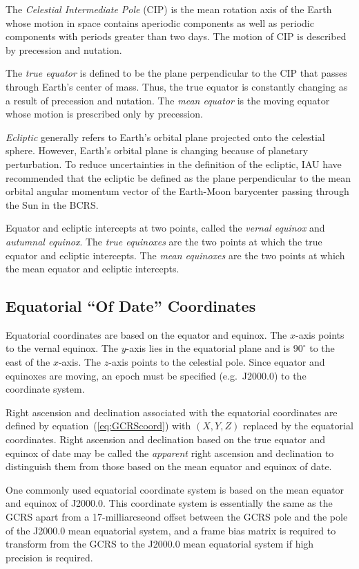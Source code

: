 \documentclass[12pt]{article}
\begin{document}
The {\em Celestial Intermediate Pole} (CIP) is the mean rotation axis of the Earth 
whose motion in space contains aperiodic components as well as periodic 
components with periods greater than two days. The motion of CIP is described 
by precession and nutation.

The {\em true equator} is defined to be the plane perpendicular to the CIP 
that passes through Earth's center of mass. Thus, the true equator is constantly 
changing as a result of precession and nutation. The {\em mean equator} 
is the moving equator whose motion is prescribed only by precession. 

{\em Ecliptic} generally refers to Earth's orbital plane projected onto the 
celestial sphere. However, Earth's orbital plane is changing because of 
planetary perturbation. To reduce uncertainties in the definition of the 
ecliptic, IAU have recommended that the ecliptic be defined as the plane 
perpendicular to the mean orbital angular momentum vector of the Earth-Moon 
barycenter passing through the Sun in the BCRS.

Equator and ecliptic intercepts at two points, called the {\em vernal equinox} and 
{\em autumnal equinox}. The {\em true equinoxes} are the two points at which the true 
equator and ecliptic intercepts. The {\em mean equinoxes} are the two points 
at which the mean equator and ecliptic intercepts.

\subsection{Equatorial ``Of Date'' Coordinates} 

Equatorial coordinates are based on the equator and equinox. The $x$-axis 
points to the vernal equinox. The $y$-axis lies in the equatorial plane 
and is $90^\circ$ to the east of the $x$-axis. The $z$-axis points to 
the celestial pole. Since equator 
and equinoxes are moving, an epoch must be specified (e.g.\ J2000.0) to the coordinate 
system.  

Right ascension and declination associated with the equatorial coordinates 
are defined by equation~(\ref{eq:GCRScoord}) with $(X,Y,Z)$ replaced by the 
equatorial coordinates. Right ascension and declination based on the 
true equator and equinox of date may be called the {\em apparent} right ascension and 
declination to distinguish them from those based on the mean equator and 
equinox of date.

One commonly used equatorial coordinate system is based on the mean equator and 
equinox of J2000.0. This coordinate system is essentially the same as the GCRS 
apart from a 17-milliarcseond offset between the GCRS pole and the pole of 
the J2000.0 mean equatorial system, and a frame bias matrix is required to 
transform from the GCRS to the J2000.0 mean equatorial system if high precision
is required.
\end{document}

